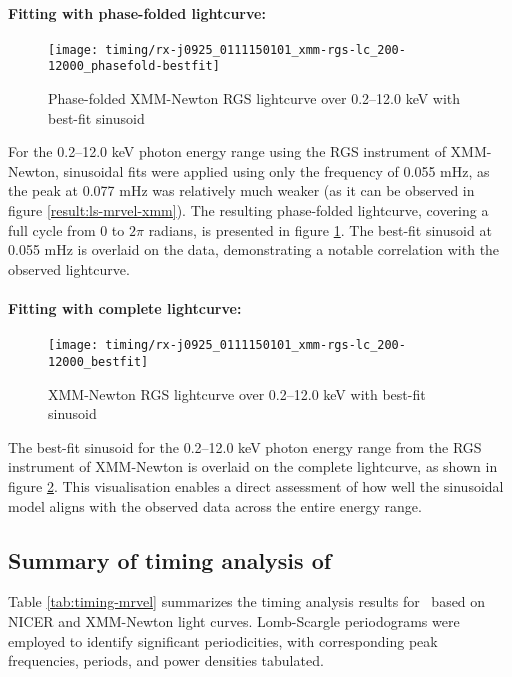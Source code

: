 				\paragraph{Fitting with phase-folded lightcurve:}
				\begin{figure}[h!]
					\centering
					\texttt{[image: timing/rx-j0925\_0111150101\_xmm-rgs-lc\_200-12000\_phasefold-bestfit]}
					\caption{Phase-folded XMM-Newton RGS lightcurve over 0.2--12.0 keV with best-fit sinusoid}
					\label{result:lc-phase-fold-mrvel-xmm-rgs:200-12000-bestfit}
				\end{figure}
				For the 0.2--12.0 keV photon energy range using the RGS instrument of XMM-Newton, sinusoidal fits were applied using only the frequency of 0.055 mHz, as the peak at 0.077 mHz was relatively much weaker (as it can be observed in figure \ref{result:ls-mrvel-xmm}). The resulting phase-folded lightcurve, covering a full cycle from 0 to $2\pi$ radians, is presented in figure \ref{result:lc-phase-fold-mrvel-xmm-rgs:200-12000-bestfit}. The best-fit sinusoid at 0.055 mHz is overlaid on the data, demonstrating a notable correlation with the observed lightcurve.
				
				\paragraph{Fitting with complete lightcurve:}
				\begin{figure}[h!]
					\centering
					\texttt{[image: timing/rx-j0925\_0111150101\_xmm-rgs-lc\_200-12000\_bestfit]}
					\caption{XMM-Newton RGS lightcurve over 0.2--12.0 keV with best-fit sinusoid}
					\label{result:lc-mrvel-xmm-rgs:200-12000-bestfit}
				\end{figure}
				The best-fit sinusoid for the 0.2--12.0 keV photon energy range from the RGS instrument of XMM-Newton is overlaid on the complete lightcurve, as shown in figure \ref{result:lc-mrvel-xmm-rgs:200-12000-bestfit}. This visualisation enables a direct assessment of how well the sinusoidal model aligns with the observed data across the entire energy range.

		\subsection{Summary of timing analysis of \source}
		Table \ref{tab:timing-mrvel} summarizes the timing analysis results for \source\ based on NICER and XMM-Newton light curves. Lomb-Scargle periodograms were employed to identify significant periodicities, with corresponding peak frequencies, periods, and power densities tabulated.
		
